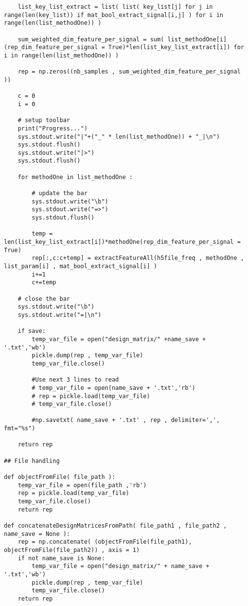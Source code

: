 \documentclass{article}
\begin{document}
\begin{lstlisting}
    list_key_list_extract = list( list( key_list[j] for j in range(len(key_list)) if mat_bool_extract_signal[i,j] ) for i in range(len(list_methodOne)) )
    
    sum_weighted_dim_feature_per_signal = sum( list_methodOne[i](rep_dim_feature_per_signal = True)*len(list_key_list_extract[i]) for i in range(len(list_methodOne)) )
    
    rep = np.zeros((nb_samples , sum_weighted_dim_feature_per_signal ))
    
    c = 0
    i = 0
    
    # setup toolbar
    print("Progress...")
    sys.stdout.write("|"+("_" * len(list_methodOne)) + "_|\n")
    sys.stdout.flush()
    sys.stdout.write("|>")
    sys.stdout.flush()
    
    for methodOne in list_methodOne :
        
        # update the bar
        sys.stdout.write("\b")
        sys.stdout.write("=>")
        sys.stdout.flush()
        
        temp = len(list_key_list_extract[i])*methodOne(rep_dim_feature_per_signal = True)
        rep[:,c:c+temp] = extractFeatureAll(h5file_freq , methodOne , list_param[i] , mat_bool_extract_signal[i] )
        i+=1
        c+=temp
    
    # close the bar
    sys.stdout.write("\b")
    sys.stdout.write("=|\n")
    
    if save:
        temp_var_file = open("design_matrix/" +name_save + '.txt','wb')
        pickle.dump(rep , temp_var_file)
        temp_var_file.close()
        
        #Use next 3 lines to read
        # temp_var_file = open(name_save + '.txt','rb')
        # rep = pickle.load(temp_var_file)
        # temp_var_file.close()
        
        #np.savetxt( name_save + '.txt' , rep , delimiter=',', fmt="%s")
    
    return rep

## File handling

def objectFromFile( file_path ):
    temp_var_file = open(file_path ,'rb')
    rep = pickle.load(temp_var_file)
    temp_var_file.close()
    return rep

def concatenateDesignMatricesFromPath( file_path1 , file_path2 , name_save = None ):
    rep = np.concatenate( (objectFromFile(file_path1), objectFromFile(file_path2)) , axis = 1)
    if not name_save is None:
        temp_var_file = open("design_matrix/" + name_save + '.txt','wb')
        pickle.dump(rep , temp_var_file)
        temp_var_file.close()
    return rep


\end{lstlisting}
\end{document}
